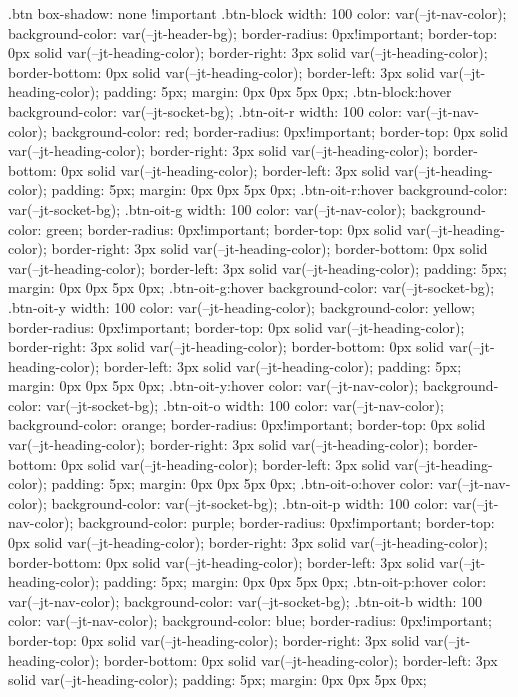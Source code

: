 .btn{
box-shadow: none !important
}
.btn-block{
width: 100%
color: var(--jt-nav-color);
background-color: var(--jt-header-bg);
border-radius: 0px!important;
border-top: 0px solid var(--jt-heading-color);
border-right: 3px solid var(--jt-heading-color);
border-bottom: 0px solid var(--jt-heading-color);
border-left: 3px solid var(--jt-heading-color);
padding: 5px;
margin: 0px 0px 5px 0px;
}
.btn-block:hover{
background-color: var(--jt-socket-bg);
}
.btn-oit-r{
width: 100%
color: var(--jt-nav-color);
background-color: red;
border-radius: 0px!important;
border-top: 0px solid var(--jt-heading-color);
border-right: 3px solid var(--jt-heading-color);
border-bottom: 0px solid var(--jt-heading-color);
border-left: 3px solid var(--jt-heading-color);
padding: 5px;
margin: 0px 0px 5px 0px;
}
.btn-oit-r:hover{
background-color: var(--jt-socket-bg);
}
.btn-oit-g{
width: 100%
color: var(--jt-nav-color);
background-color: green;
border-radius: 0px!important;
border-top: 0px solid var(--jt-heading-color);
border-right: 3px solid var(--jt-heading-color);
border-bottom: 0px solid var(--jt-heading-color);
border-left: 3px solid var(--jt-heading-color);
padding: 5px;
margin: 0px 0px 5px 0px;
}
.btn-oit-g:hover{
background-color: var(--jt-socket-bg);
}
.btn-oit-y{
width: 100%
color: var(--jt-heading-color);
background-color: yellow;
border-radius: 0px!important;
border-top: 0px solid var(--jt-heading-color);
border-right: 3px solid var(--jt-heading-color);
border-bottom: 0px solid var(--jt-heading-color);
border-left: 3px solid var(--jt-heading-color);
padding: 5px;
margin: 0px 0px 5px 0px;
}
.btn-oit-y:hover{
color: var(--jt-nav-color);
background-color: var(--jt-socket-bg);
}
.btn-oit-o{
width: 100%
color: var(--jt-nav-color);
background-color: orange;
border-radius: 0px!important;
border-top: 0px solid var(--jt-heading-color);
border-right: 3px solid var(--jt-heading-color);
border-bottom: 0px solid var(--jt-heading-color);
border-left: 3px solid var(--jt-heading-color);
padding: 5px;
margin: 0px 0px 5px 0px;
}
.btn-oit-o:hover{
color: var(--jt-nav-color);
background-color: var(--jt-socket-bg);
}
.btn-oit-p{
width: 100%
color: var(--jt-nav-color);
background-color: purple;
border-radius: 0px!important;
border-top: 0px solid var(--jt-heading-color);
border-right: 3px solid var(--jt-heading-color);
border-bottom: 0px solid var(--jt-heading-color);
border-left: 3px solid var(--jt-heading-color);
padding: 5px;
margin: 0px 0px 5px 0px;
}
.btn-oit-p:hover{
color: var(--jt-nav-color);
background-color: var(--jt-socket-bg);
}
.btn-oit-b{
width: 100%
color: var(--jt-nav-color);
background-color: blue;
border-radius: 0px!important;
border-top: 0px solid var(--jt-heading-color);
border-right: 3px solid var(--jt-heading-color);
border-bottom: 0px solid var(--jt-heading-color);
border-left: 3px solid var(--jt-heading-color);
padding: 5px;
margin: 0px 0px 5px 0px;
}
